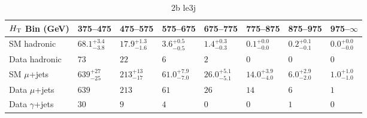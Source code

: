 \documentclass[8pt]{article}
\def\scalht{\mbox{$H_{\rm{T}}$}\xspace}
\newcommand\T{\rule{0pt}{2.6ex}}
\newcommand\B{\rule[-1.2ex]{0pt}{0pt}}
\begin{document}
\begin{table}[ht!]
\caption{2b le3j}
\label{tab:ensemble-2b le3j}
\centering
\begin{tabular}{ llllllll }

\hline
\scalht Bin (GeV)       & 375--475                       & 475--575                       & 575--675                       & 675--775                       & 775--875                       & 875--975                       & 975--$\infty$                  \\ [1.000000ex]
\hline
SM hadronic\T           & $68.1^{+3.4}_{-3.8}$           & $17.9^{+1.3}_{-1.6}$           & $3.6^{+0.5}_{-0.5}$            & $1.4^{+0.3}_{-0.3}$            & $0.1^{+0.0}_{-0.0}$            & $0.2^{+0.1}_{-0.1}$            & $0.0^{+0.0}_{-0.0}$            \\ 
Data hadronic\B         & $73$                           & $22$                           & $6$                            & $2$                            & $0$                            & $0$                            & $0$                            \\ 
\hline
SM $\mu$+jets\T         & $639^{+27}_{-25}$              & $213^{+13}_{-17}$              & $61.0^{+7.9}_{-7.0}$           & $26.0^{+5.1}_{-5.1}$           & $14.0^{+3.9}_{-4.0}$           & $6.0^{+2.9}_{-2.0}$            & $1.0^{+1.0}_{-1.0}$            \\ 
Data $\mu$+jets\B       & $639$                          & $213$                          & $61$                           & $26$                           & $14$                           & $6$                            & $1$                            \\ 
\hline
Data $\gamma$+jets\B    & $30$                           & $9$                            & $4$                            & $0$                            & $0$                            & $1$                            & $0$                            \\ 
\hline

\end{tabular}
\end{table}
\end{document}
